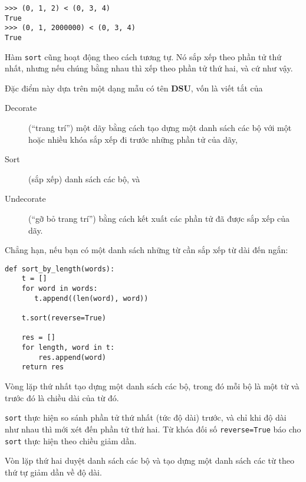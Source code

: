 \documentclass[11pt]{book}
\begin{document}
\beforeverb
\begin{verbatim}
>>> (0, 1, 2) < (0, 3, 4)
True
>>> (0, 1, 2000000) < (0, 3, 4)
True
\end{verbatim}
\afterverb
%
Hàm {\tt sort} cũng hoạt động theo cách tương tự. Nó sắp xếp
theo phần tử thứ nhất, nhưng nếu chúng bằng nhau thì xếp theo
phần tử thứ hai, và cứ như vậy.

Đặc điểm này dựa trên một dạng mẫu có tên {\bf DSU}, vốn là viết tắt của

\begin{description}

\item[Decorate] (``trang trí'') một dãy bằng cách tạo dựng một danh sách
các bộ với một hoặc nhiều khóa sắp xếp đi trước những phần tử của dãy,

\item[Sort] (sắp xếp) danh sách các bộ, và

\item[Undecorate] (``gỡ bỏ trang trí'') bằng cách kết xuất các phần tử đã
được sắp xếp của dãy.

\end{description}

\label{DSU}

Chẳng hạn, nếu bạn có một danh sách những từ cần sắp xếp từ dài đến ngắn:

\beforeverb
\begin{verbatim}
def sort_by_length(words):
    t = []
    for word in words:
       t.append((len(word), word))

    t.sort(reverse=True)

    res = []
    for length, word in t:
        res.append(word)
    return res
\end{verbatim}
\afterverb
%
Vòng lặp thứ nhất tạo dựng một danh sách các bộ, trong đó mỗi bộ là
một từ và trước đó là chiều dài của từ đó.

{\tt sort} thực hiện so sánh phần tử thứ nhất (tức độ dài) trước, và chỉ khi độ dài 
như nhau thì mới xét đến phần tử thứ hai. Từ khóa đối số 
{\tt reverse=True} báo cho {\tt sort} thực hiện theo chiều giảm dần.


Vòn lặp thứ hai duyệt danh sách các bộ và tạo dựng một danh sách các từ theo
thứ tự giảm dần về độ dài.
\end{document}
